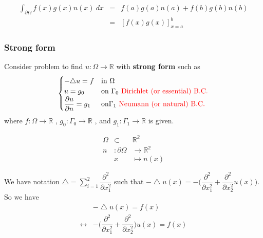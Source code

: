 \documentclass[a4paper,10pt]{article}
\begin{document}
\vspace{2cm}

\begin{eqnarray}\nonumber
\int_{\partial \Omega} f(x) g(x) n(x) \ dx & = & f(a)g(a)n(a) + f(b)g(b)n(b) \\ \nonumber
& = & [f(x)g(x)]_{x=a}^{b}
\end{eqnarray}


\subsubsection{Strong form}
Consider problem to find $ u : \Omega \rightarrow \mathbb{R} $ with \textbf{strong form} such as 
\begin{equation}\label{strong_form}
\begin{cases}
-\triangle u = f & \text{in } \Omega\\
u = g_{0} & \text{on } \Gamma_{0} \ \text{\textcolor{red}{Dirichlet (or essential) B.C.}} \\
\dfrac{\partial u }{\partial n} = g_{1} & \text{on} \Gamma_{1} \ \text{\textcolor{red}{Neumann (or natural) B.C. }}
\end{cases}
\end{equation}
where $ f : \Omega \rightarrow \mathbb{R} $ , $ g_{0} : \Gamma_{0} \rightarrow \mathbb{R} $ , and $ g_{1} : \Gamma_{1} \rightarrow \mathbb{R} $ is given.

\vspace{4cm}

\begin{eqnarray}\nonumber
\Omega &\subset &\mathbb{R^2} \\ \nonumber
n &: \partial \Omega &\rightarrow \mathbb{R^2} \\ \nonumber
&x &\mapsto n(x)
\end{eqnarray}

We have notation $ \bigtriangleup = \sum_{i=1}^{2} \dfrac{\partial^2}{\partial x_{1}^{2}} $ such that $ -\bigtriangleup u(x) = -\big( \dfrac{\partial^{2}}{\partial x_{1}^{2}} + \dfrac{\partial^{2}}{\partial x_{2}^{2}} u(x) \big) $. So we have
\begin{eqnarray}\nonumber
& -\bigtriangleup u(x) = f(x) \\ \nonumber
\leftrightarrow &  - \big( \dfrac{\partial^{2}}{\partial x_{1}^{2}} + \dfrac{\partial^{2}}{\partial x_{2}^{2}} \big) u(x) = f(x)
\end{eqnarray}
\end{document}

